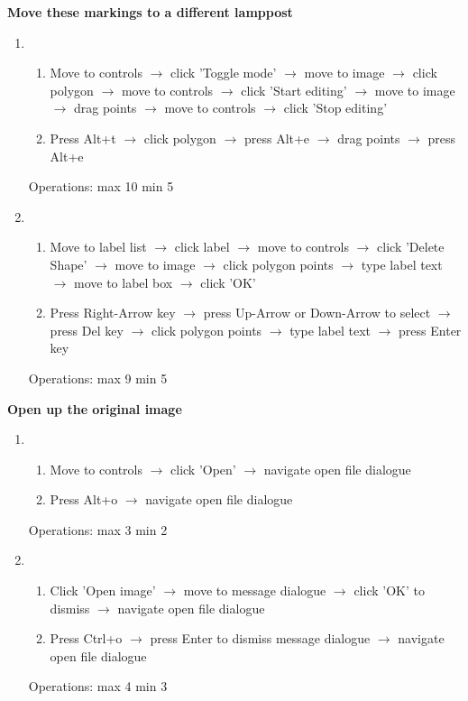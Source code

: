 \documentclass[a4paper,11pt,oneside]{article}
\begin{document}
{\bf Move these markings to a different lamppost}
\begin{enumerate}
    \item
    \begin{enumerate}
        \item Move to controls $\rightarrow$ click 'Toggle mode' $\rightarrow$ move to image $\rightarrow$ click polygon $\rightarrow$ move to controls $\rightarrow$ click 'Start editing' $\rightarrow$ move to image $\rightarrow$ drag points $\rightarrow$ move to controls $\rightarrow$ click 'Stop editing'
        \item Press Alt+t $\rightarrow$ click polygon $\rightarrow$ press Alt+e $\rightarrow$ drag points $\rightarrow$ press Alt+e
    \end{enumerate}
    Operations: max 10 min 5
    \item
    \begin{enumerate}
        \item Move to label list $\rightarrow$ click label $\rightarrow$ move to controls $\rightarrow$ click 'Delete Shape' $\rightarrow$ move to image $\rightarrow$ click polygon points $\rightarrow$ type label text $\rightarrow$ move to label box $\rightarrow$ click 'OK'
        \item Press Right-Arrow key $\rightarrow$ press Up-Arrow or Down-Arrow to select $\rightarrow$ press Del key $\rightarrow$ click polygon points $\rightarrow$ type label text $\rightarrow$ press Enter key
    \end{enumerate}
    Operations: max 9 min 5
\end{enumerate}

{\bf Open up the original image}
\begin{enumerate}
    \item
    \begin{enumerate}
        \item Move to controls $\rightarrow$ click 'Open' $\rightarrow$ navigate open file dialogue
        \item Press Alt+o $\rightarrow$ navigate open file dialogue
    \end{enumerate}
    Operations: max 3 min 2
    \item
    \begin{enumerate}
        \item Click 'Open image' $\rightarrow$ move to message dialogue $\rightarrow$ click 'OK' to dismiss $\rightarrow$ navigate open file dialogue
        \item Press Ctrl+o $\rightarrow$ press Enter to dismiss message dialogue $\rightarrow$ navigate open file dialogue
    \end{enumerate}
    Operations: max 4 min 3
\end{enumerate}
\end{document}

